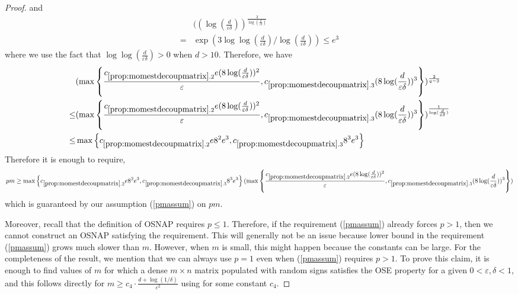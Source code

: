 \documentclass[11pt]{amsart}
\numberwithin{equation}{section}
\numberwithin{equation}{section}
\theoremstyle{remark}
\theoremstyle{definition}
\begin{document}
\begin{proof}
and
\begin{align*}
    &( (\log(\frac{d}{\varepsilon \delta}))^{\frac{3}{\log (\frac{d}{\varepsilon \delta})}}
    \\ = & \exp(3\log\log(\frac{d}{\varepsilon \delta})/\log (\frac{d}{\varepsilon \delta})) \le e^3
\end{align*}
where we use the fact that $\log\log(\frac{d}{\varepsilon \delta})>0$ when $d>10$.
Therefore, we have
\begin{align*}&(\max \left\{ \frac{c_{\ref*{prop:momestdecoupmatrix}.2}{e} (8\log(\frac{d}{\varepsilon \delta}))^2}{ \varepsilon}, c_{\ref*{prop:momestdecoupmatrix}.3} (8\log(\frac{d}{\varepsilon \delta}))^3 \right\})^{\frac{2}{q-2}} \\\le& (\max \left\{ \frac{c_{\ref*{prop:momestdecoupmatrix}.2}{e} (8\log(\frac{d}{\varepsilon \delta}))^2}{ \varepsilon}, c_{\ref*{prop:momestdecoupmatrix}.3} (8\log(\frac{d}{\varepsilon \delta}))^3 \right\})^{\frac{1}{\log (\frac{d}{\varepsilon \delta})}}
\\\le& \max \left\{ c_{\ref*{prop:momestdecoupmatrix}.2}{e} 8^2e^3, c_{\ref*{prop:momestdecoupmatrix}.3} 8^3 e^3 \right\} \end{align*}
Therefore it is enough to require,
\begin{align*}pm \ge \max \left\{ c_{\ref*{prop:momestdecoupmatrix}.2}{e} 8^2e^3, c_{\ref*{prop:momestdecoupmatrix}.3} 8^3 e^3 \right\}(\max \left\{ \frac{c_{\ref*{prop:momestdecoupmatrix}.2}{e} (8\log(\frac{d}{\varepsilon \delta}))^2}{ \varepsilon}, c_{\ref*{prop:momestdecoupmatrix}.3} (8\log(\frac{d}{\varepsilon \delta}))^3 \right\})  \end{align*}
which is guaranteed by our assumption (\ref{pmassum}) on $pm$.

    Moreover, recall that the definition of OSNAP requires $p \le 1$. Therefore, if the requirement (\ref{pmassum}) already forces $p>1$, then we cannot construct an OSNAP satisfying the requirement. This will generally not be an issue because lower bound in the requirement (\ref{pmassum}) grows much slower than $m$. However, when $m$ is small, this might happen because the constants can be large. For the completeness of the result, we mention that we can always use $p=1$ even when (\ref{pmassum}) requires $p>1$. To prove this claim, it is enough to find values of $m$ for which a dense $m \times n$ matrix populated with random signs satisfies the OSE property for a given $0 < \varepsilon, \delta < 1$, and this follows directly for $m \ge c_4 \cdot \frac{d+\log(1/\delta)}{\varepsilon^2}$ using \cite[Theorem 4.6.1]{vershynin2018high} for some constant $c_4$.
    
     \end{proof}
\end{document}
